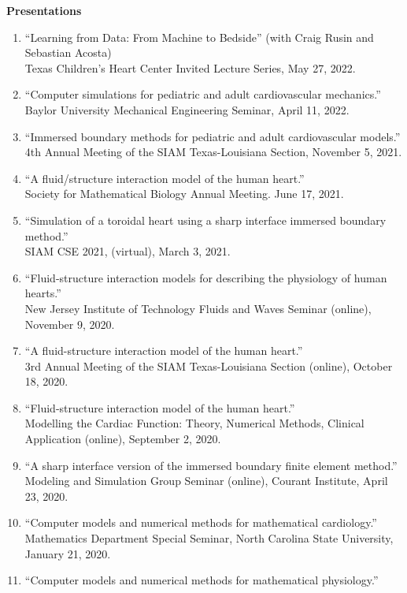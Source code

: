 \documentclass{article} %
\begin{document}
\clearpage
\vspace{0.5cm}
\noindent
{\bf \large Presentations}
\begin{enumerate}
\item ``Learning from Data: From Machine to Bedside'' (with Craig Rusin and Sebastian Acosta) \\
Texas Children's Heart Center Invited Lecture Series, May 27, 2022.
\item ``Computer simulations for pediatric and adult cardiovascular mechanics.'' \\
Baylor University Mechanical Engineering Seminar, April 11, 2022.
\item ``Immersed boundary methods for pediatric and adult cardiovascular models.''\\
4th Annual Meeting of the SIAM Texas-Louisiana Section, November 5, 2021.
\item ``A fluid/structure interaction model of the human heart.'' \\
Society for Mathematical Biology Annual Meeting.  June 17, 2021.
\item ``Simulation of a toroidal heart using a sharp interface immersed boundary method.'' \\
SIAM CSE 2021, (virtual), March 3, 2021.
\item ``Fluid-structure interaction models for describing the physiology of human hearts.'' \\ New Jersey Institute of Technology Fluids and Waves Seminar (online), November 9, 2020.
\item ``A fluid-structure interaction model of the human heart.'' \\ 3rd Annual Meeting of the SIAM Texas-Louisiana Section (online), October 18, 2020.
\item ``Fluid-structure interaction model of the human heart.'' \\
Modelling the Cardiac Function: Theory, Numerical Methods, Clinical Application (online), September 2, 2020.
\item ``A sharp interface version of the immersed boundary finite element method.'' \\
Modeling and Simulation Group Seminar (online), Courant Institute, April 23, 2020.
\item ``Computer models and numerical methods for mathematical cardiology.'' \\
Mathematics Department Special Seminar, North Carolina State University, January 21, 2020.
\item ``Computer models and numerical methods for mathematical physiology.'' \\

\end{enumerate}
\end{document}
